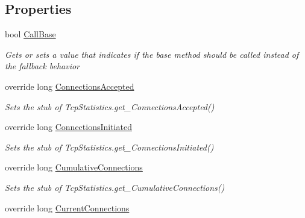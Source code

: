 \subsection*{Properties}
\begin{DoxyCompactItemize}
\item 
bool \hyperlink{class_system_1_1_net_1_1_network_information_1_1_fakes_1_1_stub_tcp_statistics_ae37f8bd6439db070fe1a4ed86393252d}{Call\-Base}
\begin{DoxyCompactList}\small\item\em Gets or sets a value that indicates if the base method should be called instead of the fallback behavior\end{DoxyCompactList}\item 
override long \hyperlink{class_system_1_1_net_1_1_network_information_1_1_fakes_1_1_stub_tcp_statistics_a70c50a9fe338035615896d699e6803cc}{Connections\-Accepted}
\begin{DoxyCompactList}\small\item\em Sets the stub of Tcp\-Statistics.\-get\-\_\-\-Connections\-Accepted()\end{DoxyCompactList}\item 
override long \hyperlink{class_system_1_1_net_1_1_network_information_1_1_fakes_1_1_stub_tcp_statistics_afa495202b5b4c48f71596b65dd7a47a7}{Connections\-Initiated}
\begin{DoxyCompactList}\small\item\em Sets the stub of Tcp\-Statistics.\-get\-\_\-\-Connections\-Initiated()\end{DoxyCompactList}\item 
override long \hyperlink{class_system_1_1_net_1_1_network_information_1_1_fakes_1_1_stub_tcp_statistics_ad25585d99739e333dabe5df099a58865}{Cumulative\-Connections}
\begin{DoxyCompactList}\small\item\em Sets the stub of Tcp\-Statistics.\-get\-\_\-\-Cumulative\-Connections()\end{DoxyCompactList}\item 
override long \hyperlink{class_system_1_1_net_1_1_network_information_1_1_fakes_1_1_stub_tcp_statistics_a2527227d5036c1807fceb29089ddf36d}{Current\-Connections}

\end{DoxyCompactItemize}
